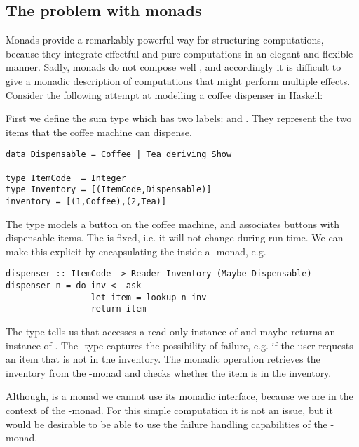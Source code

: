 \subsection{The problem with monads}\label{sec:problem-with-monads}
Monads provide a remarkably powerful way for structuring computations, because they integrate effectful and pure computations in an elegant and flexible manner.
Sadly, monads do not compose well \cite{Kammar2013}, and accordingly it is difficult to give a monadic description of computations that might perform multiple effects.
Consider the following attempt at modelling a coffee dispenser in Haskell:
\begin{example}\label{ex:coffee1}
First we define the sum type  which has two labels:  and . They represent the two items that the coffee machine can dispense.
\begin{lstlisting}[style={haskell}]
data Dispensable = Coffee | Tea deriving Show

type ItemCode  = Integer
type Inventory = [(ItemCode,Dispensable)]
inventory = [(1,Coffee),(2,Tea)]
\end{lstlisting}
The  type models a button on the coffee machine, and  associates buttons with dispensable items. The  is fixed, i.e. it will not change during run-time. We can make this explicit by encapsulating the  inside a -monad, e.g.
\begin{lstlisting}[style={haskell}]
dispenser :: ItemCode -> Reader Inventory (Maybe Dispensable)
dispenser n = do inv <- ask
                 let item = lookup n inv
                 return item
\end{lstlisting}
The type  tells us that  accesses a read-only instance of  and maybe returns an instance of . The -type captures the possibility of failure, e.g. if the user requests an item that is not in the inventory. 
The monadic operation  retrieves the inventory from the -monad and  checks whether the item  is in the inventory.  

Although,  is a monad we cannot use its monadic interface, because we are in the context of the -monad. For this simple computation it is not an issue, but it would be desirable to be able to use the failure handling capabilities of the -monad.
\end{example}
